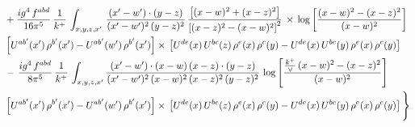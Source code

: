\documentclass[10pt]{article}
\numberwithin{equation}{section}
\begin{document}
\begin{align}
& +\frac{ig^{4}\,f^{abd}}{16\pi^{5}}\, \frac{1}{k^{+}}\,\int_{x,y,z,x'}\, \frac{(x'-w')\cdot (y-z)}{(x'-w')^{2}\,(y-z)^{2}}\, \frac{\left[(x-w)^{2}+(x-z)^{2}\right]}{\left[(x-z)^{2}-(x-w)^{2}\right]^{2}}\, \times\, \log{\left[\frac{(x-w)^{2}-(x-z)^{2}}{(x-w)^{2}}\right]}\notag \\ & \left[U^{ab'}(x')\,\rho^{b'}(x')-U^{ab'}(w')\, \rho^{b'}(x')\right]\times\, \left[U^{de}(x)\,U^{bc}(z)\, \rho^{e}(x)\,\rho^{c}(y)-U^{de}(x)\,U^{bc}(y)\,\rho^{e}(x)\,\rho^{c}(y)\right] \notag \\
&-\, \frac{ig^{4}\,f^{abd}}{8\pi^{5}}\,\frac{1}{k^{+}}\,\int_{x,y,z,x'}\frac{(x'-w')\cdot (x-w)\, (x-z)\cdot (y-z)}{(x'-w')^{2}\, (x-w)^{2}\, (x-z)^{2}\, (y-z)^{2}}\,\log{\left[\frac{\frac{k^{+}}{\vee}\,(x-w)^{2}-(x-z)^{2}}{(x-w)^{2}}\right]} \notag \\ & \left[U^{ab'}(x')\,\rho^{b'}(x')-U^{ab'}(w')\, \rho^{b'}(x')\right]\times\, \left[U^{de}(x)\,U^{bc}(z)\, \rho^{e}(x)\,\rho^{c}(y)-U^{de}(x)\,U^{bc}(y)\,\rho^{e}(x)\,\rho^{c}(y)\right]\Bigg\} \label{eq:F:G1IIIN1}
\end{align}
\end{document}
